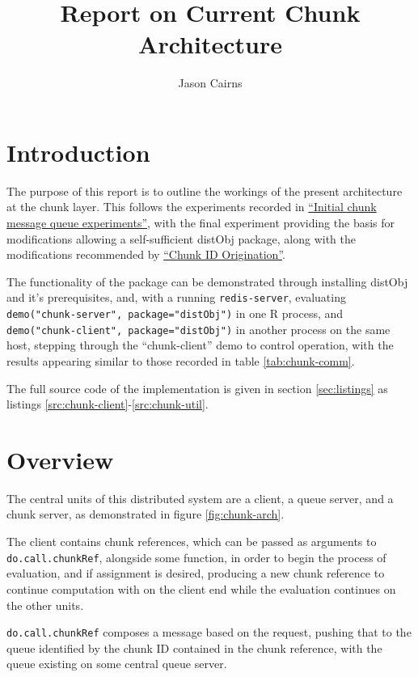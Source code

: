 \documentclass[a4paper,10pt]{article}
\begin{document}
\title{Report on Current Chunk Architecture}
\author{Jason Cairns}
  
\maketitle

\section{Introduction}

The purpose of this report is to outline the workings of the present
architecture at the chunk layer.
This follows the experiments recorded in
\href{init-chunk-msg-q-exp.pdf}{``Initial chunk message queue experiments''},
with the final experiment providing the basis for modifications allowing a
self-sufficient distObj package, along with the modifications recommended by
\href{chunk-id-orig.pdf}{``Chunk ID Origination''}.

The functionality of the package can be demonstrated through installing distObj
and it's prerequisites, and, with a running \texttt{redis-server}, evaluating
\texttt{demo("chunk-server", package="distObj")} in one R
process, and \texttt{demo("chunk-client", package="distObj")} in
another process on the same host, stepping through the ``chunk-client'' demo to
control operation, with the results appearing similar to those recorded in
table \ref{tab:chunk-comm}.

The full source code of the implementation is given in section
\ref{sec:listings} as listings \ref{src:chunk-client}-\ref{src:chunk-util}.

\section{Overview}

The central units of this distributed system are a client, a queue server, and
a chunk server, as demonstrated in figure \ref{fig:chunk-arch}.

The client contains chunk references, which can be passed as arguments to
\texttt{do.call.chunkRef}, alongside some function, in order to begin the
process of evaluation, and if assignment is desired, producing a new chunk
reference to continue computation with on the client end while the evaluation
continues on the other units.

\texttt{do.call.chunkRef} composes a message based on the request, pushing that
to the queue identified by the chunk ID contained in the chunk reference, with
the queue existing on some central queue server.
\end{document}

